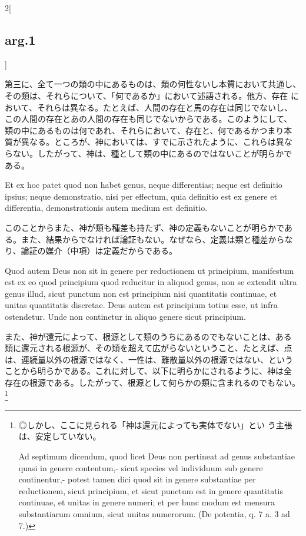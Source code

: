 \documentclass[paper=a4paper,fontsize=10pt,jafontsize=9pt,titlepage]{jlreq}
\begin{document}
\begin{paracol}{2}[\subsection{arg.1}]
\switchcolumn

第三に、全て一つの類の中にあるものは、類の何性ないし本質において共通し、
その類は、それらについて、「何であるか」において述語される。他方、存在
において、それらは異なる。たとえば、人間の存在と馬の存在は同じでないし、
この人間の存在とあの人間の存在も同じでないからである。このようにして、
類の中にあるものは何であれ、それらにおいて、存在と、何であるかつまり本
質が異なる。ところが、神においては、すでに示されたように、これらは異な
らない。したがって、神は、種として類の中にあるのではないことが明らかで
ある。

\switchcolumn*

Et ex hoc patet quod non habet genus, neque differentias; neque est
definitio ipsius; neque demonstratio, nisi per effectum, quia
definitio est ex genere et differentia, demonstrationis autem medium
est definitio.

\switchcolumn

このことからまた、神が類も種差も持たず、神の定義もないことが明らかであ
る。また、結果からでなければ論証もない。なぜなら、定義は類と種差からな
り、論証の媒介（中項）は定義だからである。

\switchcolumn*

Quod autem Deus non sit in genere per reductionem ut principium,
manifestum est ex eo quod principium quod reducitur in aliquod genus,
non se extendit ultra genus illud, sicut punctum non est principium
nisi quantitatis continuae, et unitas quantitatis discretae.  Deus
autem est principium totius esse, ut infra ostendetur. Unde non
continetur in aliquo genere sicut principium.

\switchcolumn

また、神が還元によって、根源として類のうちにあるのでもないことは、ある
類に還元される根源が、その類を超えて広がらないということ、たとえば、点
は、連続量以外の根源ではなく、一性は、離散量以外の根源ではない、という
ことから明らかである。これに対して、以下に明らかにされるように、神は全
存在の根源である。したがって、根源として何らかの類に含まれるのでもない。
\footnote{◎しかし、ここに見られる「神は還元によっても実体でない」とい
う主張は、安定していない。

\switchcolumn*[\subsection{ad.7}]

Ad septimum dicendum, quod licet Deus non pertineat ad genus
substantiae quasi in genere contentum,- sicut species vel individuum
sub genere continentur,- potest tamen dici quod sit in genere
substantiae per reductionem, sicut principium, et sicut punctum est in
genere quantitatis continuae, et unitas in genere numeri; et per hunc
modum est mensura substantiarum omnium, sicut unitas numerorum. (De
potentia, q. 7 a. 3 ad 7.)

}
\end{paracol}
\end{document}
